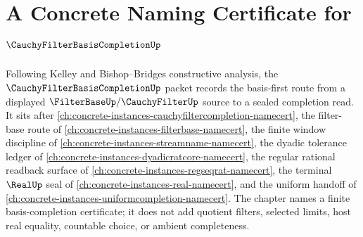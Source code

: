 \chapter{A Concrete Naming Certificate for $\CauchyFilterBasisCompletionUp$}
\label{ch:concrete-instances-cauchy-filter-basis-completion-namecert}

Following Kelley and Bishop--Bridges constructive analysis, the $\CauchyFilterBasisCompletionUp$ packet records the basis-first route from a displayed $\FilterBaseUp/\CauchyFilterUp$ source to a sealed completion read. It sits after \autoref{ch:concrete-instances-cauchyfiltercompletion-namecert}, the filter-base route of \autoref{ch:concrete-instances-filterbase-namecert}, the finite window discipline of \autoref{ch:concrete-instances-streamname-namecert}, the dyadic tolerance ledger of \autoref{ch:concrete-instances-dyadicratcore-namecert}, the regular rational readback surface of \autoref{ch:concrete-instances-regseqrat-namecert}, the terminal $\RealUp$ seal of \autoref{ch:concrete-instances-real-namecert}, and the uniform handoff of \autoref{ch:concrete-instances-uniformcompletion-namecert}. The chapter names a finite basis-completion certificate; it does not add quotient filters, selected limits, host real equality, countable choice, or ambient completeness.


